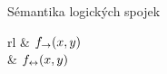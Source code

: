 \documentclass{beamer}
\begin{document}
\begin{frame}{Sémantika logických spojek}
\begin{center}
\begin{tabular}{rl}
        &
        $f_{\mathbin{\rightarrow}}(x,y)$
        \medskip
        \\

        &
        $f_{\mathbin{\leftrightarrow}}(x,y)$            
    \end{tabular}
    \end{center}

\end{frame}
\end{document}

